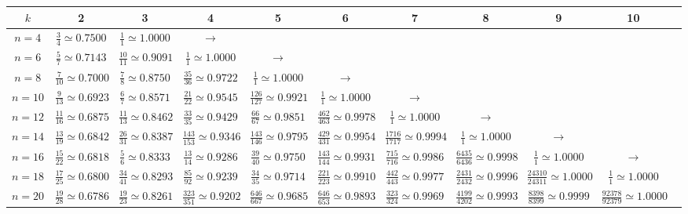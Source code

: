 \begin{landscape}
\begin{table}

\setlength\tabcolsep{2pt}
\renewcommand{\arraystretch}{1.125}
\begin{tabular}{|c||c|c|c|c|c|c|c|c|c|c}
\hline
$k$ & 2 & 3 & 4 & 5 & 6 & 7 & 8 & 9 & 10 \\ \hline \hline
$n=4$ & $\frac{3}{4}\simeq0.7500$ & $\frac{1}{1}\simeq1.0000$ & $\rightarrow$ \\ \cline{1-5}
$n=6$ & $\frac{5}{7}\simeq0.7143$ & $\frac{10}{11}\simeq0.9091$ & $\frac{1}{1}\simeq1.0000$ & $\rightarrow$ \\ \cline{1-6}
$n=8$ & $\frac{7}{10}\simeq0.7000$ & $\frac{7}{8}\simeq0.8750$ & $\frac{35}{36}\simeq0.9722$ & $\frac{1}{1}\simeq1.0000$ & $\rightarrow$ \\ \cline{1-7}
$n=10$ & $\frac{9}{13}\simeq0.6923$ & $\frac{6}{7}\simeq0.8571$ & $\frac{21}{22}\simeq0.9545$ & $\frac{126}{127}\simeq0.9921$ & $\frac{1}{1}\simeq1.0000$ & $\rightarrow$ \\ \cline{1-8}
$n=12$ & $\frac{11}{16}\simeq0.6875$ & $\frac{11}{13}\simeq0.8462$ & $\frac{33}{35}\simeq0.9429$ & $\frac{66}{67}\simeq0.9851$ & $\frac{462}{463}\simeq0.9978$ & $\frac{1}{1}\simeq1.0000$ & $\rightarrow$ \\ \cline{1-9}
$n=14$ & $\frac{13}{19}\simeq0.6842$ & $\frac{26}{31}\simeq0.8387$ & $\frac{143}{153}\simeq0.9346$ & $\frac{143}{146}\simeq0.9795$ & $\frac{429}{431}\simeq0.9954$ & $\frac{1716}{1717}\simeq0.9994$ & $\frac{1}{1}\simeq1.0000$ & $\rightarrow$ \\ \hline
$n=16$ & $\frac{15}{22}\simeq0.6818$ & $\frac{5}{6}\simeq0.8333$ & $\frac{13}{14}\simeq0.9286$ & $\frac{39}{40}\simeq0.9750$ & $\frac{143}{144}\simeq0.9931$ & $\frac{715}{716}\simeq0.9986$ & $\frac{6435}{6436}\simeq0.9998$ & $\frac{1}{1}\simeq1.0000$ & $\rightarrow$ \\ \hline
$n=18$ & $\frac{17}{25}\simeq0.6800$ & $\frac{34}{41}\simeq0.8293$ & $\frac{85}{92}\simeq0.9239$ & $\frac{34}{35}\simeq0.9714$ & $\frac{221}{223}\simeq0.9910$ & $\frac{442}{443}\simeq0.9977$ & $\frac{2431}{2432}\simeq0.9996$ & $\frac{24310}{24311}\simeq1.0000$ & $\frac{1}{1}\simeq1.0000$ \\ \hline
$n=20$ & $\frac{19}{28}\simeq0.6786$ & $\frac{19}{23}\simeq0.8261$ & $\frac{323}{351}\simeq0.9202$ & $\frac{646}{667}\simeq0.9685$ & $\frac{646}{653}\simeq0.9893$ & $\frac{323}{324}\simeq0.9969$ & $\frac{4199}{4202}\simeq0.9993$ & $\frac{8398}{8399}\simeq0.9999$ & $\frac{92378}{92379}\simeq1.0000$ \\ \hline

\end{tabular}
\end{table}
\end{landscape}

